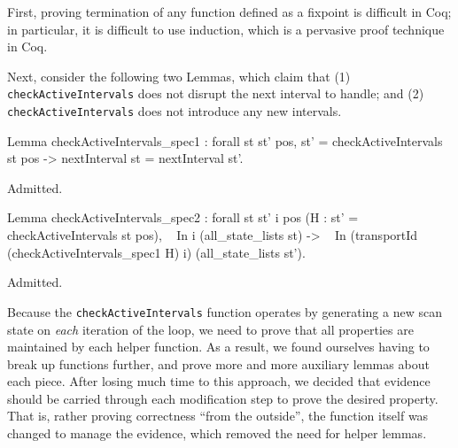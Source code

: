 \documentclass{llncs}
\begin{document}



First, proving termination of any function defined as a fixpoint is
difficult in Coq; in particular, it is difficult to use induction,
which is a pervasive proof technique in Coq.

Next, consider the following two Lemmas, which claim that (1)
\texttt{checkActiveIntervals} does not disrupt the next interval to
handle; and (2) \texttt{checkActiveIntervals} does not introduce any
new intervals.


\begin{coq_example*}
Lemma checkActiveIntervals_spec1 : forall st st' pos,
  st' = checkActiveIntervals st pos
    -> nextInterval st = nextInterval st'.
\end{coq_example*}
\begin{coq_eval}
Admitted.
\end{coq_eval}

\begin{coq_example*}
Lemma checkActiveIntervals_spec2 : forall st st' i pos
  (H : st' = checkActiveIntervals st pos),
  ~ In i (all_state_lists st)
    -> ~ In (transportId (checkActiveIntervals_spec1 H) i)
            (all_state_lists st').
\end{coq_example*}
\begin{coq_eval}
Admitted.
\end{coq_eval}

Because the \texttt{checkActiveIntervals} function operates by
generating a new scan state on \emph{each} iteration of the loop, we
need to prove that all properties are maintained by each helper
function. 
%
%
As a result, we found ourselves having to break up functions further, and
prove more and more auxiliary lemmas about each piece.  After losing much time
to this approach, we decided that evidence should be carried through each
modification step to prove the desired property.  That is, rather proving
correctness ``from the outside'', the function itself was changed to manage
the evidence, which removed the need for helper lemmas.
\end{document}
